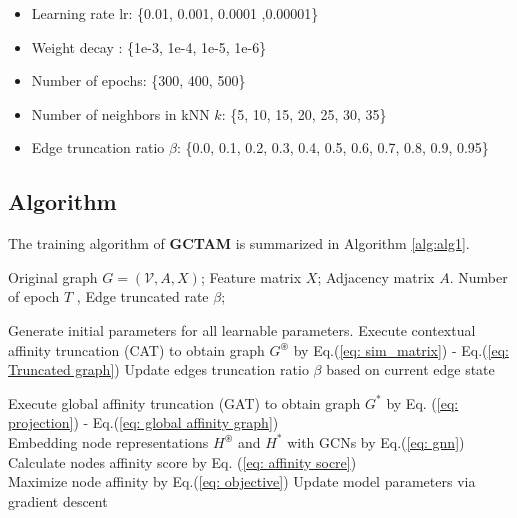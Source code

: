 \begin{appendix}
\begin{itemize}
    \item Learning rate lr: \{0.01, 0.001, 0.0001 ,0.00001\}
    \item Weight decay : \{1e-3, 1e-4, 1e-5, 1e-6\}
    \item Number of epochs: \{300, 400, 500\}
    \item Number of neighbors in kNN $k$: \{5, 10, 15, 20, 25, 30, 35\}
    \item Edge truncation ratio $\beta$: \{0.0, 0.1, 0.2, 0.3, 0.4, 0.5, 0.6, 0.7, 0.8, 0.9, 0.95\}
\end{itemize}



\subsection{Algorithm}

The training algorithm of \textbf{GCTAM} is summarized in Algorithm \ref{alg:alg1}.
\begin{algorithm}[h!]
\renewcommand{\algorithmicrequire}{\textbf{Input:}}
\renewcommand{\algorithmicensure}{\textbf{Parameters:}}
\caption{The training algorithm of GCTAM}
\label{alg:alg1}

\begin{algorithmic}
\REQUIRE Original graph $G=(\mathcal{V}, A, {X})$;  Feature matrix  ${X}$; Adjacency matrix ${A}$.
\ENSURE Number of epoch $T$ , Edge truncated rate $\beta$;
\end{algorithmic} 

\begin{algorithmic}[1]
\STATE Generate initial parameters for all learnable parameters. 
    \STATE Execute contextual affinity truncation (CAT) to obtain graph $G^{\circledast}$ by Eq.(\ref{eq: sim_matrix}) - Eq.(\ref{eq: Truncated graph})
    \STATE Update edges truncation ratio $\beta$ based on current edge state
\ENDWHILE

\STATE Execute global affinity truncation (GAT)  to obtain graph $G^{*}$ by Eq. (\ref{eq: projection}) - Eq.(\ref{eq: global affinity graph})\\
\STATE Embedding node representations ${H}^{\circledast}$ and ${H}^{*}$ with GCNs by Eq.(\ref{eq: gnn})
\STATE Calculate nodes affinity score by Eq. (\ref{eq: affinity socre})  \\
\STATE Maximize node affinity by Eq.(\ref{eq: objective})
\STATE Update model parameters via gradient descent
\ENDFOR
\end{algorithmic}
\end{algorithm}




\end{appendix}
